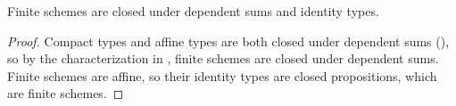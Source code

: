\begin{lemma}
  Finite schemes are closed under dependent sums and identity types.
\end{lemma}

\begin{proof}
  Compact types and affine types are both closed under dependent sums (\cite[Lemma 2.0.3]{proper-draft}), so by the characterization in ,
  finite schemes are closed under dependent sums.
  Finite schemes are affine, so their identity types are closed propositions, which are finite schemes.
\end{proof}